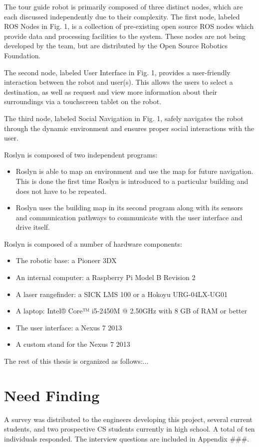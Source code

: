 \documentclass[11pt]{report}
\begin{document}
The tour guide robot is primarily composed of three distinct nodes, which are each discussed independently due to their complexity. The first node, labeled ROS Nodes in Fig. 1, is a collection of pre-existing open source ROS nodes which provide data and processing facilities to the system. These nodes are not being developed by the team, but are distributed by the Open Source Robotics Foundation.

The second node, labeled User Interface in Fig. 1, provides a user-friendly interaction between the robot and user(s). This allows the users to select a destination, as well as request and view more information about their surroundings via a touchscreen tablet on the robot.

The third node, labeled Social Navigation in Fig. 1, safely navigates the robot through the dynamic environment and ensures proper social interactions with the user.

Roslyn is composed of two independent programs:
\begin{itemize}
 \item Roslyn is able to map an environment and use the map for future navigation. This is done the first time Roslyn is introduced to a particular building and does not have to be repeated.
 \item Roslyn uses the building map in its second program along with its sensors and communication pathways to communicate with the user interface and drive itself.
\end{itemize}


Roslyn is composed of a number of hardware components:
\begin{itemize}
 \item The robotic base: a Pioneer 3DX
 \item An internal computer: a Raspberry Pi Model B Revision 2
 \item A laser rangefinder: a SICK LMS 100 or a Hokoyu URG-04LX-UG01
 \item A laptop: Intel® Core™ i5-2450M @ 2.50GHz with 8 GB of RAM or better
 \item The user interface: a Nexus 7 2013
 \item A custom stand for the Nexus 7 2013
\end{itemize}

The rest of this thesis is organized as follows:...



\section{Need Finding}
A survey was distributed to the engineers developing this project, several current students, and two prospective CS students currently in high school. A total of ten individuals responded. The interview questions are included in Appendix \#\#\#.
\end{document}
